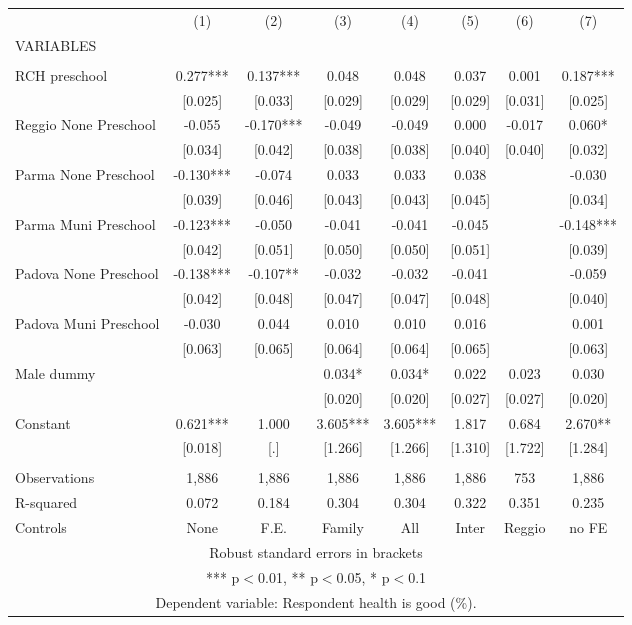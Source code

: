 \begin{tabular}{lccccccc} \hline
 & (1) & (2) & (3) & (4) & (5) & (6) & (7) \\
VARIABLES &  &  &  &  &  &  &  \\ \hline
 &  &  &  &  &  &  &  \\
RCH preschool & 0.277*** & 0.137*** & 0.048 & 0.048 & 0.037 & 0.001 & 0.187*** \\
 & [0.025] & [0.033] & [0.029] & [0.029] & [0.029] & [0.031] & [0.025] \\
Reggio None Preschool & -0.055 & -0.170*** & -0.049 & -0.049 & 0.000 & -0.017 & 0.060* \\
 & [0.034] & [0.042] & [0.038] & [0.038] & [0.040] & [0.040] & [0.032] \\
Parma None Preschool & -0.130*** & -0.074 & 0.033 & 0.033 & 0.038 &  & -0.030 \\
 & [0.039] & [0.046] & [0.043] & [0.043] & [0.045] &  & [0.034] \\
Parma Muni Preschool & -0.123*** & -0.050 & -0.041 & -0.041 & -0.045 &  & -0.148*** \\
 & [0.042] & [0.051] & [0.050] & [0.050] & [0.051] &  & [0.039] \\
Padova None Preschool & -0.138*** & -0.107** & -0.032 & -0.032 & -0.041 &  & -0.059 \\
 & [0.042] & [0.048] & [0.047] & [0.047] & [0.048] &  & [0.040] \\
Padova Muni Preschool & -0.030 & 0.044 & 0.010 & 0.010 & 0.016 &  & 0.001 \\
 & [0.063] & [0.065] & [0.064] & [0.064] & [0.065] &  & [0.063] \\
Male dummy &  &  & 0.034* & 0.034* & 0.022 & 0.023 & 0.030 \\
 &  &  & [0.020] & [0.020] & [0.027] & [0.027] & [0.020] \\
Constant & 0.621*** & 1.000 & 3.605*** & 3.605*** & 1.817 & 0.684 & 2.670** \\
 & [0.018] & [.] & [1.266] & [1.266] & [1.310] & [1.722] & [1.284] \\
 &  &  &  &  &  &  &  \\
Observations & 1,886 & 1,886 & 1,886 & 1,886 & 1,886 & 753 & 1,886 \\
R-squared & 0.072 & 0.184 & 0.304 & 0.304 & 0.322 & 0.351 & 0.235 \\
 Controls & None & F.E. & Family & All & Inter & Reggio & no FE \\ \hline
\multicolumn{8}{c}{ Robust standard errors in brackets} \\
\multicolumn{8}{c}{ *** p$<$0.01, ** p$<$0.05, * p$<$0.1} \\
\multicolumn{8}{c}{ Dependent variable: Respondent health is good (\%).} \\
\end{tabular}
